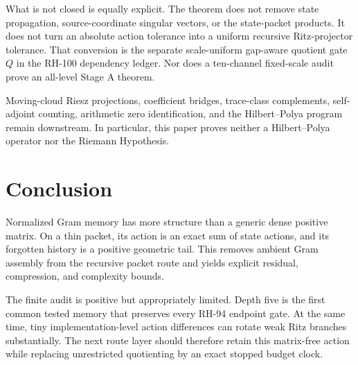 \documentclass[11pt]{article}
\theoremstyle{definition}
\theoremstyle{remark}
\begin{document}
What is not closed is equally explicit.  The theorem does not remove state
propagation, source-coordinate singular vectors, or the state-packet
products.  It does not turn an absolute action tolerance into a uniform
recursive Ritz-projector tolerance.  That conversion is the separate
scale-uniform gap-aware quotient gate $Q$ in the RH-100 dependency ledger.
Nor does a ten-channel fixed-scale audit prove an all-level Stage A theorem.

Moving-cloud Riesz projections, coefficient bridges, trace-class
complements, self-adjoint counting, arithmetic zero identification, and the
Hilbert--Polya program remain downstream.  In particular, this paper proves
neither a Hilbert--Polya operator nor the Riemann Hypothesis.

\section{Conclusion}

Normalized Gram memory has more structure than a generic dense positive
matrix.  On a thin packet, its action is an exact sum of state actions, and
its forgotten history is a positive geometric tail.  This removes ambient
Gram assembly from the recursive packet route and yields explicit residual,
compression, and complexity bounds.

The finite audit is positive but appropriately limited.  Depth five is the
first common tested memory that preserves every RH-94 endpoint gate.  At the
same time, tiny implementation-level action differences can rotate weak Ritz
branches substantially.  The next route layer should therefore retain this
matrix-free action while replacing unrestricted quotienting by an exact
stopped budget clock.



\end{document}
